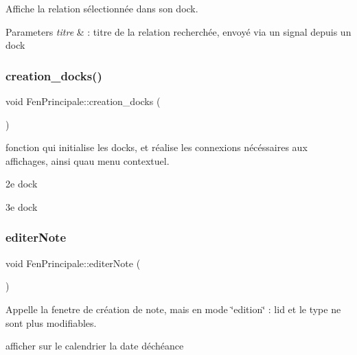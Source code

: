 Affiche la relation sélectionnée dans son dock. 


\begin{DoxyParams}{Parameters}
{\em titre} & \+: titre de la relation recherchée, envoyé via un signal depuis un dock \\
\hline
\end{DoxyParams}
\mbox{\label{class_fen_principale_ab3ef99b1adb06c0bcc57ea74ca34923e}} 
\subsubsection{\texorpdfstring{creation\+\_\+docks()}{creation\_docks()}}
{\footnotesize\ttfamily void Fen\+Principale\+::creation\+\_\+docks (\begin{DoxyParamCaption}{ }\end{DoxyParamCaption})\hspace{0.3cm}{\ttfamily [protected]}}



fonction qui initialise les docks, et réalise les connexions nécéssaires aux affichages, ainsi qu\textquotesingle{}au menu contextuel. 

2e dock

3e dock \mbox{\label{class_fen_principale_ab8b916f06d0c149b1411781e7129fab5}} 
\subsubsection{\texorpdfstring{editer\+Note}{editerNote}}
{\footnotesize\ttfamily void Fen\+Principale\+::editer\+Note (\begin{DoxyParamCaption}{ }\end{DoxyParamCaption})\hspace{0.3cm}{\ttfamily [slot]}}



Appelle la fenetre de création de note, mais en mode \char`\"{}edition\char`\"{} \+: l\textquotesingle{}id et le type ne sont plus modifiables. 

afficher sur le calendrier la date d\textquotesingle{}échéance \mbox{\label{class_fen_principale_a7dbafe44ea212955ba0b7d674ab5cc9d}} 

